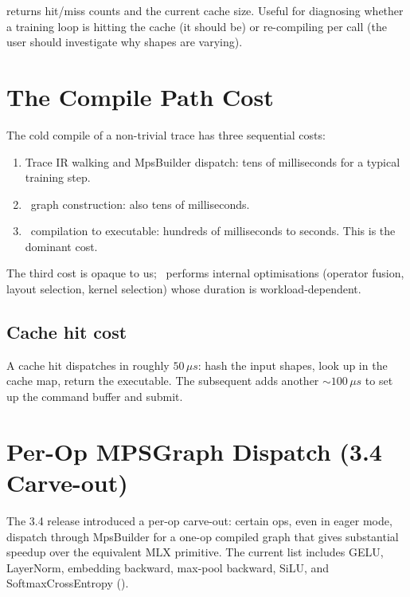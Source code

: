 returns hit/miss counts
and the current cache size. Useful for diagnosing whether a
training loop is hitting the cache (it should be) or
re-compiling per call (the user should investigate why shapes
are varying).

\section{The Compile Path Cost}
\label{sec:mps_builder:cost}

The cold compile of a non-trivial trace has three sequential
costs:

\begin{enumerate}
  \item Trace IR walking and MpsBuilder dispatch: tens of
    milliseconds for a typical training step.
  \item \MPSGraph\ graph construction: also tens of milliseconds.
  \item \MPSGraph\ compilation to executable: hundreds of
    milliseconds to seconds. This is the dominant cost.
\end{enumerate}

The third cost is opaque to us; \MPSGraph\ performs internal
optimisations (operator fusion, layout selection, kernel
selection) whose duration is workload-dependent.

\subsection{Cache hit cost}
\label{ssec:mps_builder:hit_cost}

A cache hit dispatches in roughly $50\,\mu s$: hash the input
shapes, look up in the cache map, return the executable. The
subsequent  adds another $\sim 100\,\mu s$
to set up the command buffer and submit.

\section{Per-Op MPSGraph Dispatch (3.4 Carve-out)}
\label{sec:mps_builder:per_op_carveout}

The 3.4 release introduced a per-op carve-out: certain ops, even
in eager mode, dispatch through MpsBuilder for a one-op compiled
graph that gives substantial speedup over the equivalent MLX
primitive. The current list includes GELU, LayerNorm, embedding
backward, max-pool backward, SiLU, and SoftmaxCrossEntropy
().

